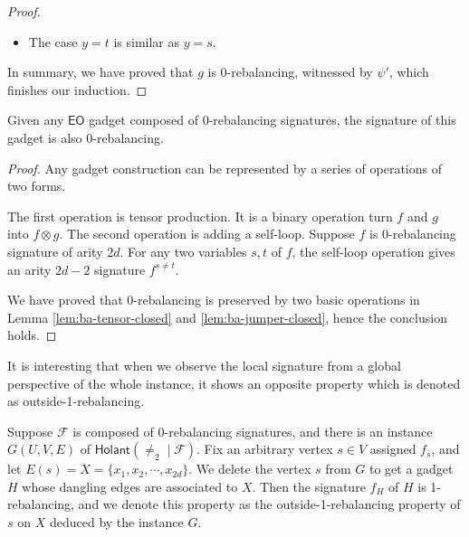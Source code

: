 \documentclass[a4paper,UKenglish,cleveref, autoref, thm-restate]{lipics-v2021}
\newcommand{\hol}[0]{\textsf{Holant}}
\newcommand{\eo}[0]{\textsf{EO}}
\newcommand{\ba}[1][0]{{{#1}-rebalancing}}
\begin{document}
\begin{proof}
\begin{itemize}
For the second part, we need to prove $g^{x=0, \psi'(x)=1}$ is \ba[0]. $g^{x=0, \psi'(x)=1}(\beta)=f^{x=0, \psi'(x)=1}(01\beta)+f^{x=0, \psi'(x)=1}(10\beta)=f^{x=0, \psi'(x)=1,s=0,t=1}(\beta)+f^{x=0, \psi'(x)=1,s=1,t=0}(\beta)$.
Because $s= \psi(x)$, we know the first item $f^{x=0, \psi'(x)=1,s=0,t=1}$ 
is 0 signature. The second item is in fact $f^{x=0, s=\psi(x)=1,t=0,\psi_2^{x=0,s=1}(t) =1}$, which is \ba[0] by the recursive definition of $f$ in the second level. 
    \item  
    The case $y=t$ is similar as $y=s$. 
\end{itemize}

In summary, we have proved that $g$ is \ba[0], witnessed by $\psi'$, which finishes our induction. 
\end{proof}


\begin{lemma}
    Given any $\eo$ gadget composed of \ba[0] signatures, the signature of this gadget is also \ba[0].
    \label{lem:bagad}
\end{lemma}

\begin{proof}
Any gadget construction can be represented by a series of operations of two forms.

The first operation is tensor production. It is a binary operation turn $f$ and $g$ into $f \otimes g$. 
The second operation is adding a self-loop. Suppose $f$ is \ba[0] signature of arity $2d$. For any two variables $s,t$ of $f$, the self-loop operation gives an arity $2d-2$ signature $f^{s \neq t}$.  

We have proved that \ba[0] is preserved by two basic operations in Lemma \ref{lem:ba-tensor-closed} and  \ref{lem:ba-jumper-closed}, hence the conclusion holds.  
\end{proof}



It is interesting that when we observe the local signature from a global perspective of the whole instance, it shows an opposite property which is denoted as outside-\ba[1]. 


\begin{lemma}\label{outside-1-rebalancing}
    Suppose $\mathcal{F}$ is composed of \ba[0] signatures, and there is an instance $G(U,V,E)$ of $\hol(\neq_2\mid\mathcal{F})$. Fix an arbitrary vertex $s\in V$ assigned $f_s$, and let $E(s)=X=\{x_1,x_2, \cdots, x_{2d}\}$. We delete the vertex $s$ from $G$ to get a gadget $H$ whose dangling edges are associated to $X$. Then the signature $f_H$ of $H$ is \ba[1], and we denote this property as the outside-1-rebalancing property of $s$ on $X$ deduced by the instance $G$.
\end{lemma}
\end{document}
